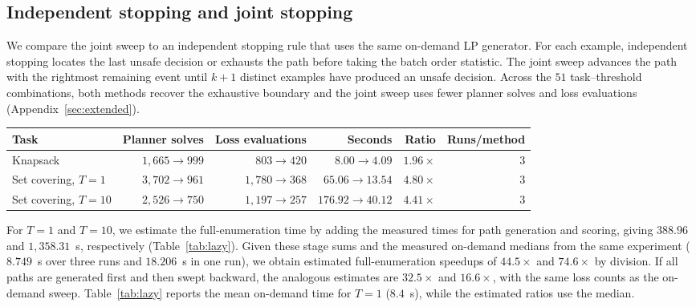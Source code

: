 \documentclass[a4paper,10pt]{article}
\theoremstyle{plain}
\theoremstyle{remark}
\begin{document}
\subsection{Independent stopping and joint stopping}\label{sec:stopping}

We compare the joint sweep to an independent stopping rule that uses the same on-demand LP generator. For each example, independent stopping locates the last unsafe decision or exhausts the path before taking the batch order statistic. The joint sweep advances the path with the rightmost remaining event until $k+1$ distinct examples have produced an unsafe decision. Across the $51$ task--threshold combinations, both methods recover the exhaustive boundary and the joint sweep uses fewer planner solves and loss evaluations (Appendix~\ref{sec:extended}).

\begin{center}
\begin{minipage}{\linewidth}
\centering\small
{}
\label{tab:stopping}
\smallskip
\begin{tabular}{@{}lrrrrr@{}}\toprule
Task & Planner solves & Loss evaluations & Seconds & Ratio & Runs/method\\\midrule
Knapsack & $1{,}665 \to 999$ & $803 \to 420$ & $8.00 \to 4.09$ & $1.96\times$ & 3\\
Set covering, $T=1$ & $3{,}702 \to 961$ & $1{,}780 \to 368$ & $65.06 \to 13.54$ & $4.80\times$ & 3\\
Set covering, $T=10$ & $2{,}526 \to 750$ & $1{,}197 \to 257$ & $176.92 \to 40.12$ & $4.41\times$ & 3\\\bottomrule
\end{tabular}
\end{minipage}
\end{center}

For $T=1$ and $T=10$, we estimate the full-enumeration time by adding the measured times for path generation and scoring, giving $388.96$ and $1{,}358.31$~s, respectively (Table~\ref{tab:lazy}). Given these stage sums and the measured on-demand medians from the same experiment ($8.749$~s over three runs and $18.206$~s in one run), we obtain estimated full-enumeration speedups of $44.5\times$ and $74.6\times$ by division. If all paths are generated first and then swept backward, the analogous estimates are $32.5\times$ and $16.6\times$, with the same loss counts as the on-demand sweep. Table~\ref{tab:lazy} reports the mean on-demand time for $T=1$ ($8.4$~s), while the estimated ratios use the median.
\end{document}
